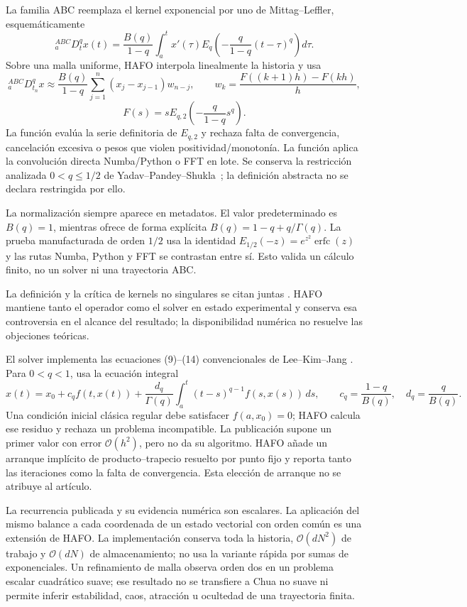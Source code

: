 La familia ABC reemplaza el kernel exponencial por uno de Mittag--Leffler,
esquemáticamente
\[
 {}_a^{ABC}D_t^q x(t)=\frac{B(q)}{1-q}
 \int_a^t x'(\tau)
 E_q\!\left(-\frac{q}{1-q}(t-\tau)^q\right)d\tau .
\]
Sobre una malla uniforme, HAFO interpola linealmente la historia y usa
\[
 {}_a^{ABC}D_{t_n}^q x\approx
 \frac{B(q)}{1-q}\sum_{j=1}^{n}(x_j-x_{j-1})w_{n-j},
 \qquad
 w_k=\frac{F((k+1)h)-F(kh)}{h},
\]
\[
 F(s)=sE_{q,2}\!\left(-\frac{q}{1-q}s^q\right).
\]
La función  evalúa la serie definitoria
de \(E_{q,2}\) y rechaza falta de convergencia, cancelación excesiva o pesos que
violen positividad/monotonía. La función
 aplica la convolución directa
Numba/Python o FFT en lote. Se conserva la restricción analizada
\(0<q\le1/2\) de Yadav--Pandey--Shukla~\cite{YadavEtAl2019}; la definición
abstracta no se declara restringida por ello.

La normalización siempre aparece en metadatos. El valor predeterminado es
\(B(q)=1\), mientras  ofrece de forma
explícita \(B(q)=1-q+q/\Gamma(q)\). La prueba manufacturada de orden \(1/2\)
usa la identidad \(E_{1/2}(-z)=e^{z^2}\operatorname{erfc}(z)\) y las rutas
Numba, Python y FFT se contrastan entre sí. Esto valida un cálculo finito, no
un solver ni una trayectoria ABC.

La definición y la crítica de kernels no singulares se citan juntas
\cite{AtanganaBaleanu2016,DiethelmEtAl2020}. HAFO mantiene tanto el operador
como el solver en estado experimental y conserva esa controversia en el alcance
del resultado; la disponibilidad numérica no resuelve las objeciones teóricas.

El solver  implementa las
ecuaciones (9)--(14) convencionales de Lee--Kim--Jang
\cite{LeeKimJang2024}. Para \(0<q<1\), usa la ecuación integral
\[
 x(t)=x_0+c_q f(t,x(t))+
 \frac{d_q}{\Gamma(q)}\int_a^t(t-s)^{q-1}f(s,x(s))\,ds,
 \qquad
 c_q=\frac{1-q}{B(q)},\quad d_q=\frac{q}{B(q)}.
\]
Una condición inicial clásica regular debe satisfacer \(f(a,x_0)=0\); HAFO
calcula ese residuo y rechaza un problema incompatible. La publicación supone
un primer valor con error \(\mathcal O(h^2)\), pero no da su algoritmo. HAFO
añade un arranque implícito de producto--trapecio resuelto por punto fijo y
reporta tanto las iteraciones como la falta de convergencia. Esta elección de
arranque no se atribuye al artículo.

La recurrencia publicada y su evidencia numérica son escalares. La aplicación
del mismo balance a cada coordenada de un estado vectorial con orden común es
una extensión de HAFO. La implementación conserva toda la historia,
\(\mathcal O(dN^2)\) de trabajo y \(\mathcal O(dN)\) de almacenamiento; no usa
la variante rápida por sumas de exponenciales. Un refinamiento de malla observa
orden dos en un problema escalar cuadrático suave; ese resultado no se
transfiere a Chua no suave ni permite inferir estabilidad, caos,
atracción u ocultedad de una trayectoria finita.

